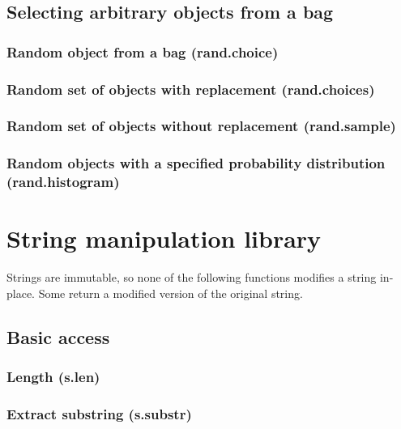 \documentclass{article}
\theoremstyle{definition}
\begin{document}
\subsection{Selecting arbitrary objects from a bag}

\subsubsection{Random object from a bag (rand.choice)}

\subsubsection{Random set of objects with replacement (rand.choices)}

\subsubsection{Random set of objects without replacement (rand.sample)}

\subsubsection{Random objects with a specified probability distribution (rand.histogram)}

\pagebreak

\section{String manipulation library}

Strings are immutable, so none of the following functions modifies a string in-place.  Some return a modified version of the original string.

\subsection{Basic access}

\subsubsection{Length (s.len)}

\subsubsection{Extract substring (s.substr)}
\end{document}
